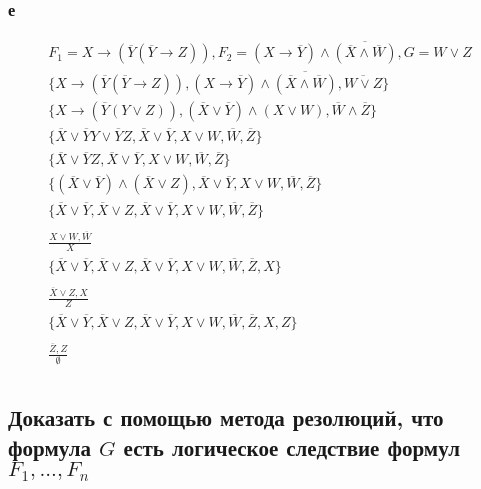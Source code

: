 \documentclass[12pt]{article}
\begin{document}
\subsubsection{е}
\begin{gather*}
  F_1 = X \rightarrow \left( \overline{Y}\left( \overline{Y} \rightarrow Z \right)\right), F_2 = \left(X \rightarrow \overline{Y}\right) \wedge \overline{\left(\overline{X} \wedge \overline{W}\right)}, G = W \vee Z \\
  \{X \rightarrow \left( \overline{Y}\left( \overline{Y} \rightarrow Z \right)\right), \left(X \rightarrow \overline{Y}\right) \wedge \overline{\left(\overline{X} \wedge \overline{W}\right)}, \overline{W \vee Z}\} \\
  \{X \rightarrow \left( \overline{Y}\left( Y \vee Z \right)\right), \left(\overline{X} \vee \overline{Y}\right) \wedge \left(X \vee W \right), \overline{W} \wedge \overline{Z}\} \\
  \{\overline{X} \vee \overline{Y}Y \vee \overline{Y}Z, \overline{X} \vee \overline{Y}, X \vee W, \overline{W}, \overline{Z}\} \\
  \{\overline{X} \vee \overline{Y}Z, \overline{X} \vee \overline{Y}, X \vee W, \overline{W}, \overline{Z}\} \\
  \{\left(\overline{X} \vee \overline{Y} \right) \wedge \left(\overline{X} \vee Z \right), \overline{X} \vee \overline{Y}, X \vee W, \overline{W}, \overline{Z}\} \\
  \{\overline{X} \vee \overline{Y}, \overline{X} \vee Z, \overline{X} \vee \overline{Y}, X \vee W, \overline{W}, \overline{Z}\} \\
  \\
  \frac{X \vee W, \overline{W}}{X} \\
  \{\overline{X} \vee \overline{Y}, \overline{X} \vee Z, \overline{X} \vee \overline{Y}, X \vee W, \overline{W}, \overline{Z}, X\} \\
  \\
  \frac{\overline{X} \vee Z, X}{Z} \\
  \{\overline{X} \vee \overline{Y}, \overline{X} \vee Z, \overline{X} \vee \overline{Y}, X \vee W, \overline{W}, \overline{Z}, X, Z\} \\
  \\
  \frac{\overline{Z}, Z}{\emptyset} \\
\end{gather*}

\subsection{Доказать с помощью метода резолюций, что формула $G$ есть логическое следствие формул $F_1,...,F_n$ }
\end{document}
